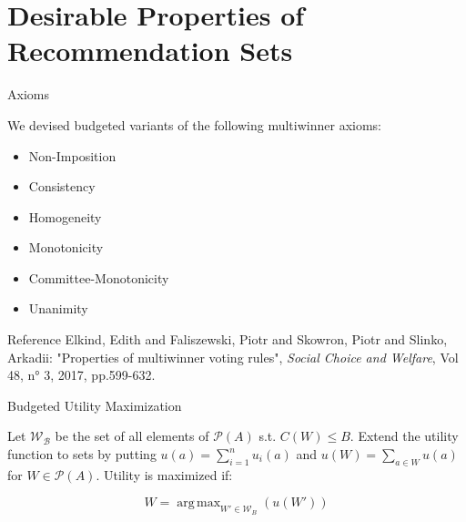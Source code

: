 \documentclass{beamer}
\DeclareMathOperator*{\argmax}{arg\,max}
\begin{document}

\section{Desirable Properties of Recommendation Sets}

\begin{frame}{Axioms}

We devised budgeted variants of the following multiwinner axioms:

\begin{itemize}
	\item Non-Imposition 
	\item Consistency 
	\item Homogeneity 
	\item Monotonicity      
	\item Committee-Monotonicity 
	\item Unanimity
\end{itemize}

\begin{block}{Reference}
	Elkind, Edith
	and Faliszewski, Piotr
	and Skowron, Piotr
	and Slinko, Arkadii: "Properties of multiwinner voting rules", \emph{Social Choice and Welfare}, Vol 48, n° 3, 2017, pp.599-632.
\end{block}

\end{frame}

\begin{frame}{Budgeted Utility Maximization}

Let $\mathcal {W_B}$ be the set of all elements of $\mathcal{P}(A)$ s.t. $C(W)\leq B$. Extend the utility function to sets by putting $u(a)=\sum_{i=1}^n u_i(a)$ and $u(W)=\sum_{a\in W} u(a)$ for $W\in \mathcal{P}(A)$. Utility is maximized if:

\[
W=\argmax_{W'\in \mathcal{W}_B}(u(W')) 
\]

	
\end{frame}
\end{document}
